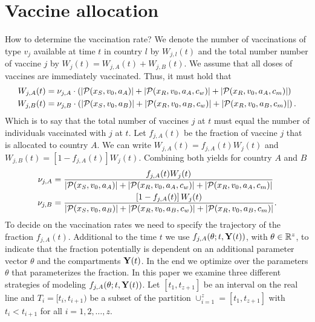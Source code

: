 \section{Vaccine allocation}
How to determine the vaccination rate? We denote the number of vaccinations of type $v_j$ available at time $t$ in country $l$ by $W_{j,l}(t)$ and the total number number of vaccine $j$ by $W_j(t) = W_{j,A}(t) + W_{j,B}(t)$. We assume that all doses of vaccines are immediately vaccinated. Thus, it must hold that 
\begin{align*}
W_{j,A}(t) &= \nu_{j, A} \cdot \left( |\mathcal{P}(x_S, v_0, a_A)| + |\mathcal{P}(x_R, v_0, a_A, c_w)| + |\mathcal{P}(x_R, v_0, a_A, c_m)| \right) \notag \\
W_{j,B}(t) &= \nu_{j, B} \cdot \left( |\mathcal{P}(x_S, v_0, a_B)| + |\mathcal{P}(x_R, v_0, a_B, c_w)| + |\mathcal{P}(x_R, v_0, a_B, c_m)| \right). 
\end{align*}
Which is to say that the total number of vaccines $j$ at $t$ must equal the number of individuals vaccinated with $j$ at $t$. Let $f_{j,A}(t)$ be the fraction of vaccine $j$ that is allocated to country $A$. We can write $W_{j,A}(t) = f_{j,A}(t) W_j(t)$ and $W_{j,B}(t) = \left[1 - f_{j,A}(t)\right] W_j(t)$. Combining both yields for country $A$ and $B$
\begin{align*}
\nu_{j,A} &= \frac{ f_{j,A}(t) W_{j}(t)}{|\mathcal{P}(x_S, v_0, a_A)| + |\mathcal{P}(x_R, v_0, a_A, c_w)| + |\mathcal{P}(x_R, v_0, a_A, c_m)|} \notag \\
\nu_{j,B} &= \frac{\left[1 - f_{j,A}(t)\right]  W_{j}(t)}{|\mathcal{P}(x_S, v_0, a_B)| + |\mathcal{P}(x_R, v_0, a_B, c_w)| + |\mathcal{P}(x_R, v_0, a_B, c_m)|}.
\end{align*}
To decide on the vaccination rates we need to specify the trajectory of the fraction $f_{j,A}(t)$. Additional to the time $t$ we use $f_{j,A}(\theta; t, \mathbf{Y}(t))$, with $\theta \in \mathbb{R}^z$, to indicate that the fraction potentially is dependent on an additional parameter vector $\theta$ and the compartments $\mathbf{Y}(t)$. In the end we optimize over the parameters $\theta$ that parameterizes the fraction. In this paper we examine three different strategies of modeling $f_{j,A}(\theta; t, \mathbf{Y}(t))$. Let $[t_1, t_{z+1}]$ be an interval on the real line and $T_i = [t_i, t_{i+1})$ be a subset of the partition $\cup_{i=1}^z=[t_1, t_{z+1}]$ with $t_i < t_{i+1}$ for all $i = 1, 2, \dots, z$.   
